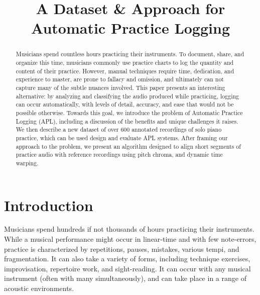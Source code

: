 \documentclass{article}
\title{A Dataset \& Approach for Automatic Practice Logging}
\begin{document}
%
\maketitle
%
\begin{abstract}
Musicians spend countless hours practicing their instruments.  To document, share, and organize this time, musicians commonly use practice charts to log the quantity and content of their practice. However, manual techniques require time, dedication, and experience to master, are prone to fallacy and omission, and ultimately can not capture many of the subtle nuances involved.  This paper presents an interesting alternative: by analyzing and classifying the audio produced while practicing, logging can occur automatically, with levels of detail, accuracy, and ease that would not be possible otherwise. Towards this goal, we introduce the problem of Automatic Practice Logging (APL), including a discussion of the benefits and unique challenges it raises. We then describe a new dataset of over 600 annotated recordings of solo piano practice, which can be used design and evaluate APL systems. After framing our approach to the problem, we present an algorithm designed to align short segments of practice audio with reference recordings using pitch chroma, and dynamic time warping.

\end{abstract}
%
\section{Introduction}\label{sec:introduction}

Musicians spend hundreds if not thousands of hours practicing their instruments. 
While a musical performance might occur in linear-time and with few note-errors, practice is characterized by repetitions, pauses, mistakes, various tempi, and fragmentation.
It can also take a variety of forms, including technique exercises, improvisation, repertoire work, and sight-reading. It can occur with any musical instrument (often with many simultaneously), and can take place in a range of acoustic environments.    
\end{document}
